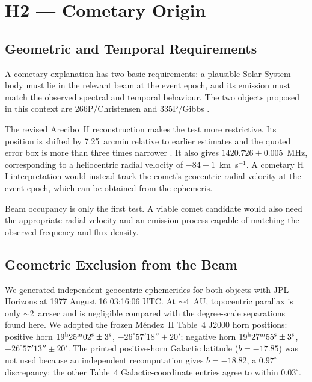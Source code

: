 \documentclass[crop]{CSL}
\begin{document}
\section{H2 --- Cometary Origin}
\label{sec:h2}

\subsection{Geometric and Temporal Requirements}

A cometary explanation has two basic requirements: a plausible Solar System body must lie in the relevant beam at the event epoch, and its emission must match the observed spectral and temporal behaviour. The two objects proposed in this context are 266P/Christensen and 335P/Gibbs \citep{paris2017}.

The revised Arecibo~II reconstruction makes the test more restrictive. Its position is shifted by 7.25~arcmin relative to earlier estimates and the quoted error box is more than three times narrower \citep{mendez2025}. It also gives $1420.726\pm0.005$~MHz, corresponding to a heliocentric radial velocity of $-84\pm1$~km~s$^{-1}$. A cometary H\,I interpretation would instead track the comet's geocentric radial velocity at the event epoch, which can be obtained from the ephemeris.

Beam occupancy is only the first test. A viable comet candidate would also need the appropriate radial velocity and an emission process capable of matching the observed frequency and flux density.

\subsection{Geometric Exclusion from the Beam}
\label{sec:h2_ephem}

We generated independent geocentric ephemerides for both objects with JPL Horizons at 1977 August 16 03:16:06 UTC. At $\sim4$~AU, topocentric parallax is only $\sim2$~arcsec and is negligible compared with the degree-scale separations found here. We adopted the frozen M\'endez~II Table~4 J2000 horn positions: positive horn $19^{\rm h}25^{\rm m}02^{\rm s}\pm3^{\rm s}$, $-26^\circ57'18''\pm20'$; negative horn $19^{\rm h}27^{\rm m}55^{\rm s}\pm3^{\rm s}$, $-26^\circ57'13''\pm20'$. The printed positive-horn Galactic latitude ($b=-17.85$) was not used because an independent recomputation gives $b=-18.82$, a $0.97^\circ$ discrepancy; the other Table~4 Galactic-coordinate entries agree to within $0.03^\circ$.
\end{document}

